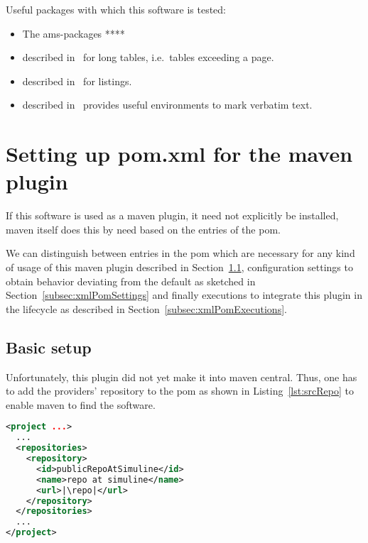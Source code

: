 \noindent
Useful packages with which this software is tested: 
%
\begin{itemize}
\item
The ams-packages **** 
\item
{} described in~\cite{LongTabP} 
for long tables, i.e.~tables exceeding a page. 
\item
{} described in~\cite{ListingsP} for listings. 
\item
{} described in~\cite{FancyVerbP} 
provides useful environments to mark verbatim text. 
\end{itemize}


\section{Setting up pom.xml for the maven plugin}\label{sec:xmlPom}

If this software is used as a maven plugin,
it need not explicitly be installed, maven itself does this by need
based on the entries of the pom. 

We can distinguish between entries in the pom 
which are necessary for any kind of usage of this maven plugin 
described in Section~\ref{subsec:xmlPomBasic}, 
configuration settings to obtain behavior deviating from the default 
as sketched in Section~\ref{subsec:xmlPomSettings} 
and finally executions to integrate this plugin in the lifecycle 
as described in Section~\ref{subsec:xmlPomExecutions}. 

\subsection{Basic setup}\label{subsec:xmlPomBasic}

Unfortunately, this plugin did not yet make it into maven central.
Thus, one has to add the providers' repository to the pom
as shown in Listing~\ref{lst:srcRepo} to enable maven to find the software. 

\begin{lstlisting}[language=xml, basicstyle=\footnotesize,
escapechar=|,
float, captionpos=b, label={lst:srcRepo}, 
caption={The source repository for this plugin}]
<project ...>
  ...
  <repositories>
    <repository>
      <id>publicRepoAtSimuline</id>
      <name>repo at simuline</name>
      <url>|\repo|</url>
    </repository>
  </repositories>
  ...
</project>
\end{lstlisting}

